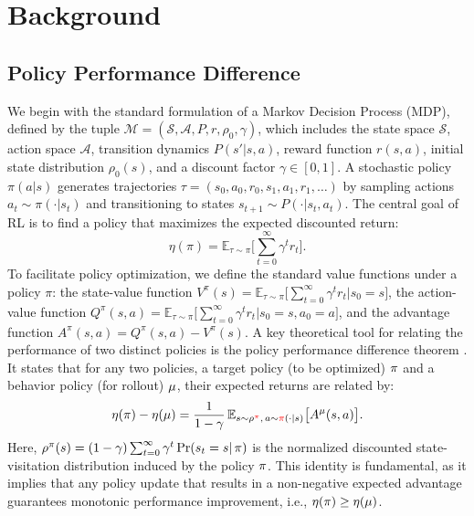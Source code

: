 
\section{Background}  
\label{sec:background}  

  
\subsection{Policy Performance Difference}  
  
We begin with the standard formulation of a Markov Decision Process (MDP), defined by the tuple $\mathcal{M} = (\mathcal{S}, \mathcal{A}, P, r, \rho_0, \gamma)$, which includes the state space $\mathcal{S}$, action space $\mathcal{A}$, transition dynamics $P(s'|s,a)$, reward function $r(s,a)$, initial state distribution $\rho_0(s)$, and a discount factor $\gamma \in [0,1]$. A stochastic policy $\pi(a | s)$ generates trajectories $\tau = (s_0, a_0, r_0, s_1, a_1, r_1, \ldots)$ by sampling actions $a_t \sim \pi(\cdot | s_t)$ and transitioning to states $s_{t+1} \sim P(\cdot | s_t, a_t)$. The central goal of RL is to find a policy that maximizes the expected discounted return:
$$  
\eta(\pi) = \mathbb{E}_{\tau \sim \pi} \Bigg[ \sum_{t=0}^{\infty} \gamma^t r_t \Bigg].  
$$  
To facilitate policy optimization, we define the standard value functions under a policy $\pi$: the state-value function $V^\pi(s) = \mathbb{E}_{\tau \sim \pi}\Big[ \sum_{t=0}^{\infty} \gamma^t r_t \big| s_0 = s \Big]$, the action-value function $Q^\pi(s,a) = \mathbb{E}_{\tau \sim \pi}\Big[ \sum_{t=0}^{\infty} \gamma^t r_t \big| s_0 = s, a_0 = a \Big]$, and the advantage function $A^\pi(s,a) = Q^\pi(s,a) - V^\pi(s)$. A key theoretical tool for relating the performance of two distinct policies is the policy performance difference theorem \cite{kakade2002approximately}. It states that for any two policies, a target policy (to be optimized) $\operatorname*{{\textcolor{black}{\pi}}}$ and a behavior policy (for rollout) $\operatorname*{{\textcolor{black}{\mu}}}$, their expected returns are related by:
\begin{equation}
\eta(\operatorname*{{\textcolor{black}{\pi}}}) - \eta(\operatorname*{{\textcolor{black}{\mu}}}) = \frac{1}{1-\gamma} \, \mathbb{E}_{s \sim \rho^{\operatorname*{{\textcolor{red}{\pi}}}}, \, a \sim \operatorname*{{\textcolor{red}{\pi}}}(\cdot| s)} \big[ A^{\operatorname*{{\textcolor{black}{\mu}}}}(s,a) \big].  
\label{eq:perf-diff}
\end{equation}
Here, $\rho^{\operatorname*{{\textcolor{black}{\pi}}}}(s) = (1-\gamma) \sum_{t=0}^{\infty} \gamma^t \Pr(s_t = s | \operatorname*{{\textcolor{black}{\pi}}})$ is the normalized discounted state-visitation distribution induced by the policy $\operatorname*{{\textcolor{black}{\pi}}}$. This identity is fundamental, as it implies that any policy update that results in a non-negative expected advantage guarantees monotonic performance improvement, i.e., $\eta(\operatorname*{{\textcolor{black}{\pi}}}) \ge \eta(\operatorname*{{\textcolor{black}{\mu}}})$.

